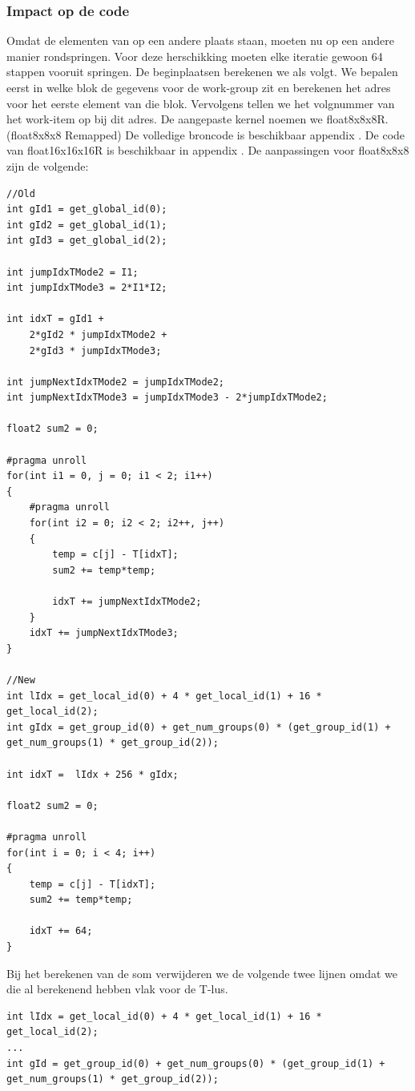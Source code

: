 \subsubsection{Impact op de code}
Omdat de elementen van \TT{} op een andere plaats staan, moeten nu op een andere manier rondspringen. Voor deze herschikking moeten elke iteratie gewoon 64 stappen vooruit springen. De beginplaatsen berekenen we als volgt. We bepalen eerst in welke blok de gegevens voor de work-group zit en berekenen het adres voor het eerste element van die blok. Vervolgens tellen we het volgnummer van het work-item op bij dit adres. De aangepaste kernel noemen we float8x8x8R. (float8x8x8 Remapped) De volledige broncode is beschikbaar appendix . De code van float16x16x16R is beschikbaar in appendix . De aanpassingen voor float8x8x8 zijn de volgende:
\begin{lstlisting}
//Old
int gId1 = get_global_id(0);
int gId2 = get_global_id(1);
int gId3 = get_global_id(2);

int jumpIdxTMode2 = I1;
int jumpIdxTMode3 = 2*I1*I2;

int idxT = gId1 + 
	2*gId2 * jumpIdxTMode2 +
	2*gId3 * jumpIdxTMode3;

int jumpNextIdxTMode2 = jumpIdxTMode2;
int jumpNextIdxTMode3 = jumpIdxTMode3 - 2*jumpIdxTMode2;

float2 sum2 = 0;

#pragma unroll
for(int i1 = 0, j = 0; i1 < 2; i1++)
{
	#pragma unroll
	for(int i2 = 0; i2 < 2; i2++, j++)
	{
		temp = c[j] - T[idxT];
		sum2 += temp*temp;
		
		idxT += jumpNextIdxTMode2;
	}
	idxT += jumpNextIdxTMode3;
}

//New
int lIdx = get_local_id(0) + 4 * get_local_id(1) + 16 * get_local_id(2);
int gIdx = get_group_id(0) + get_num_groups(0) * (get_group_id(1) + get_num_groups(1) * get_group_id(2));

int idxT =  lIdx + 256 * gIdx;   

float2 sum2 = 0;

#pragma unroll
for(int i = 0; i < 4; i++)
{
	temp = c[j] - T[idxT];
	sum2 += temp*temp;
		
	idxT += 64;
}
\end{lstlisting}
Bij het berekenen van de som verwijderen we de volgende twee lijnen omdat we die al berekenend hebben vlak voor de T-lus.
\begin{lstlisting}
int lIdx = get_local_id(0) + 4 * get_local_id(1) + 16 * get_local_id(2);
...
int gId = get_group_id(0) + get_num_groups(0) * (get_group_id(1) + get_num_groups(1) * get_group_id(2));
\end{lstlisting}

